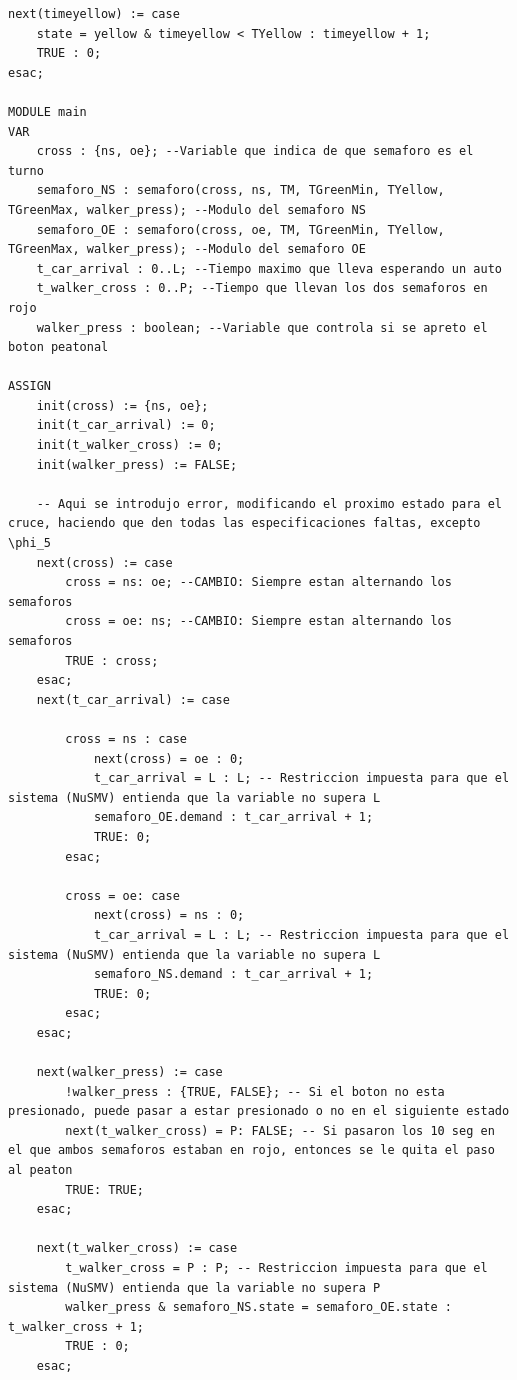 \begin{lstlisting}[language=NuSMV, caption={Modelo con errores introducidos para violar specs 1, 2 y 3}]
next(timeyellow) := case
    state = yellow & timeyellow < TYellow : timeyellow + 1;
    TRUE : 0;
esac;

MODULE main
VAR
    cross : {ns, oe}; --Variable que indica de que semaforo es el turno
    semaforo_NS : semaforo(cross, ns, TM, TGreenMin, TYellow, TGreenMax, walker_press); --Modulo del semaforo NS
    semaforo_OE : semaforo(cross, oe, TM, TGreenMin, TYellow, TGreenMax, walker_press); --Modulo del semaforo OE
    t_car_arrival : 0..L; --Tiempo maximo que lleva esperando un auto
    t_walker_cross : 0..P; --Tiempo que llevan los dos semaforos en rojo
    walker_press : boolean; --Variable que controla si se apreto el boton peatonal

ASSIGN
    init(cross) := {ns, oe};
    init(t_car_arrival) := 0;
    init(t_walker_cross) := 0;
    init(walker_press) := FALSE;
    
    -- Aqui se introdujo error, modificando el proximo estado para el cruce, haciendo que den todas las especificaciones faltas, excepto \phi_5
    next(cross) := case
        cross = ns: oe; --CAMBIO: Siempre estan alternando los semaforos
        cross = oe: ns; --CAMBIO: Siempre estan alternando los semaforos
        TRUE : cross;
    esac;
    next(t_car_arrival) := case
        
        cross = ns : case
            next(cross) = oe : 0;
            t_car_arrival = L : L; -- Restriccion impuesta para que el sistema (NuSMV) entienda que la variable no supera L
            semaforo_OE.demand : t_car_arrival + 1;
            TRUE: 0; 
        esac;
        
        cross = oe: case
            next(cross) = ns : 0;
            t_car_arrival = L : L; -- Restriccion impuesta para que el sistema (NuSMV) entienda que la variable no supera L
            semaforo_NS.demand : t_car_arrival + 1;
            TRUE: 0;
        esac;
    esac;

    next(walker_press) := case
        !walker_press : {TRUE, FALSE}; -- Si el boton no esta presionado, puede pasar a estar presionado o no en el siguiente estado
        next(t_walker_cross) = P: FALSE; -- Si pasaron los 10 seg en el que ambos semaforos estaban en rojo, entonces se le quita el paso al peaton
        TRUE: TRUE;
    esac;

    next(t_walker_cross) := case 
        t_walker_cross = P : P; -- Restriccion impuesta para que el sistema (NuSMV) entienda que la variable no supera P
        walker_press & semaforo_NS.state = semaforo_OE.state : t_walker_cross + 1;
        TRUE : 0;
    esac;
    

\end{lstlisting}
